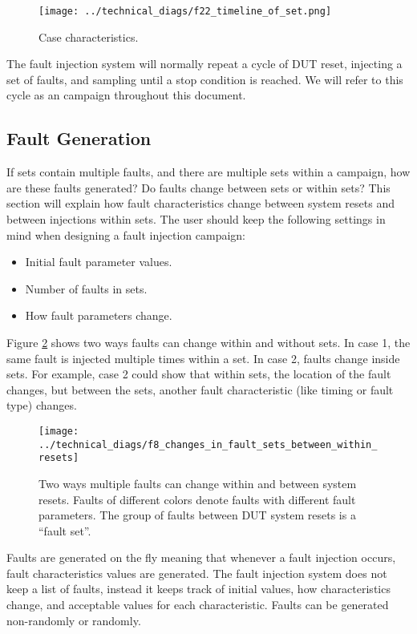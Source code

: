 \documentclass[]{report}
\begin{document}
\begin{figure}[h]
	\centering
	\texttt{[image: ../technical\_diags/f22\_timeline\_of\_set.png]}
	\caption{Case characteristics.}
	\label{fig:casecharacteristics}
\end{figure}

The fault injection system will normally repeat a cycle of DUT reset, injecting a set of faults, and sampling until a stop condition is reached. We will refer to this cycle as an campaign throughout this document.

\subsection{Fault Generation}
If sets contain multiple faults, and there are multiple sets within a campaign, how are these faults generated? Do faults change between sets or within sets? This section will explain how fault characteristics change between system resets and between injections within sets. The user should keep the following settings in mind when designing a fault injection campaign:
\begin{itemize}
	\item Initial fault parameter values.
	\item Number of faults in sets.
	\item How fault parameters change.
\end{itemize}

Figure \ref{fig:two_ways_sets} shows two ways faults can change within and without sets. In case 1, the same fault is injected multiple times within a set. In case 2, faults change inside sets. 
For example, case 2 could show that within sets, the location of the fault changes, but between the sets, another fault characteristic (like timing or fault type) changes.

\begin{figure}[h]
	\centering
	\texttt{[image: ../technical\_diags/f8\_changes\_in\_fault\_sets\_between\_within\_resets]}
	\caption{Two ways multiple faults can change within and between system resets. Faults of different colors denote faults with different fault parameters. The group of faults between DUT system resets is a “fault set”.}
	\label{fig:two_ways_sets}
\end{figure}

Faults are generated on the fly meaning that whenever a fault injection occurs, fault characteristics values are generated. The fault injection system does not keep a list of faults, instead it keeps track of initial values, how characteristics change, and acceptable values for each characteristic. Faults can be generated non-randomly or randomly.
\end{document}

